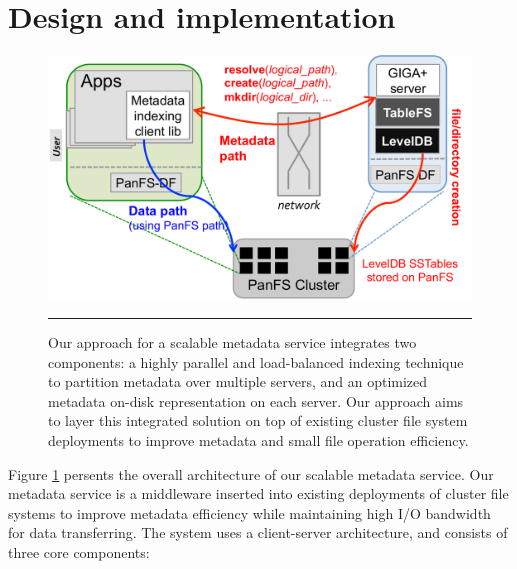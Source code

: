 \section{Design and implementation}

\begin{figure}[t]   %
\centerline{\includegraphics[scale=0.3]{./figs/giga-impl-leveldb-clusterfs}}
\caption{{
Our approach for a scalable metadata service integrates two components: a highly
parallel and load-balanced indexing technique \cite{GIGA11}
to partition metadata over multiple servers,
and an optimized metadata on-disk representation \cite{TableFS} on each server.
Our approach aims to layer this integrated solution on top of existing cluster
file system deployments to improve metadata and small file operation efficiency.
}}
\vspace{10pt}
\hrule
\label{fig:design}
\end{figure}       %

Figure \ref{fig:design} persents the overall architecture of our scalable
metadata service. Our metadata service is a middleware inserted into
existing deployments of cluster file systems to improve metadata efficiency
while maintaining high I/O bandwidth for data transferring.
The system uses a client-server architecture,
and consists of three core components:

